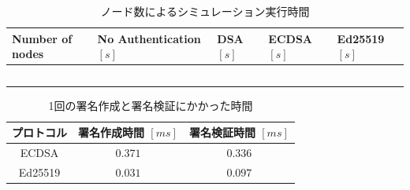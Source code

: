 \begin{longtable}{
    >{\raggedright\arraybackslash}p{3cm}
    >{\raggedright\arraybackslash}p{3.7cm}
    >{\raggedright\arraybackslash}p{2.5cm}
    >{\raggedright\arraybackslash}p{2.5cm}
    >{\raggedright\arraybackslash}p{2.5cm}
  }
  \caption{ノード数によるシミュレーション実行時間}
  \label{tab:exp3_simtime} \\
  \endfirsthead
  \hline
  Number of nodes & No Authentication $[s]$ & DSA $[s]$ & ECDSA $[s]$ & Ed25519 $[s]$ \\ \hline \hline
  \multicolumn{1}{c}{$37$} &
  \multicolumn{1}{c}{$14.1802$} &
  \multicolumn{1}{l}{$69.9882$} &
  \multicolumn{1}{l}{$55.0108$} &
  \multicolumn{1}{l}{$24.4069$} \\
  \multicolumn{1}{c}{$74$} &
  \multicolumn{1}{c}{$50.5984$} &
  \multicolumn{1}{l}{$267.433$} &
  \multicolumn{1}{l}{$194.408$} &
  \multicolumn{1}{l}{$89.2728$} \\
  \multicolumn{1}{c}{$112$} &
  \multicolumn{1}{c}{$110.405$} &
  \multicolumn{1}{l}{$625.504$} &
  \multicolumn{1}{l}{$436.926$} &
  \multicolumn{1}{l}{$200.901$} \\
  \multicolumn{1}{c}{$148$} &
  \multicolumn{1}{c}{$196.971$} &
  \multicolumn{1}{l}{$1172.57$} &
  \multicolumn{1}{l}{$910.373$} &
  \multicolumn{1}{l}{$431.346$} \\
  \multicolumn{1}{c}{$185$} &
  \multicolumn{1}{c}{$345.059$} &
  \multicolumn{1}{l}{$1908.7$} &
  \multicolumn{1}{l}{$1324.55$} &
  \multicolumn{1}{l}{$635.155$} \\ \hline

\end{longtable}

\begin{longtable}{ccc}
  \caption{1回の署名作成と署名検証にかかった時間}
  \label{tab:exp3_sigtime} \\
  \endfirsthead
  \hline
  \multicolumn{1}{c}{プロトコル} &
  \multicolumn{1}{c}{署名作成時間 $[ms]$} &
  \multicolumn{1}{c}{署名検証時間 $[ms]$} \\ \hline \hline
  ECDSA & $0.371$ & $0.336$ \\
  Ed25519 & $0.031$ & $0.097$ \\ \hline
\end{longtable}

